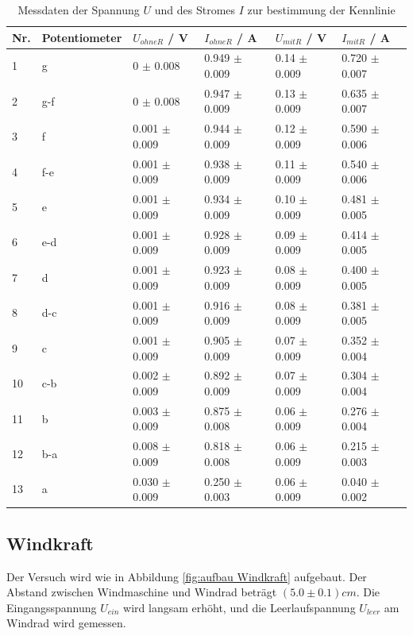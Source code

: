 \documentclass[12pt,a4paper,twoside]{article}
\begin{document}
\begin{table}[H]
    \centering
    \caption{Messdaten der Spannung $U$ und des Stromes $I$ zur bestimmung der Kennlinie}
    \label{tab:Messdaten Kennlinie Brennstoffzelle}
    \begin{tabular}{| l | l | l | l | l | l |}
        \hline
        Nr. & Potentiometer & $U_{ohneR}$  / V & $I_{ohneR}$ / A & $U_{mitR}$ / V & $I_{mitR}$ / A \\
        \hline
        1  & g    & 0     $\pm$ 0.008 & 0.949 $\pm$ 0.009 & 0.14 $\pm$ 0.009 & 0.720 $\pm$ 0.007 \\
        2  & g-f  & 0     $\pm$ 0.008 & 0.947 $\pm$ 0.009 & 0.13 $\pm$ 0.009 & 0.635 $\pm$ 0.007 \\
        3  & f    & 0.001 $\pm$ 0.009 & 0.944 $\pm$ 0.009 & 0.12 $\pm$ 0.009 & 0.590 $\pm$ 0.006 \\
        4  & f-e  & 0.001 $\pm$ 0.009 & 0.938 $\pm$ 0.009 & 0.11 $\pm$ 0.009 & 0.540 $\pm$ 0.006 \\
        5  & e    & 0.001 $\pm$ 0.009 & 0.934 $\pm$ 0.009 & 0.10 $\pm$ 0.009 & 0.481 $\pm$ 0.005 \\
        6  & e-d  & 0.001 $\pm$ 0.009 & 0.928 $\pm$ 0.009 & 0.09 $\pm$ 0.009 & 0.414 $\pm$ 0.005 \\
        7  & d    & 0.001 $\pm$ 0.009 & 0.923 $\pm$ 0.009 & 0.08 $\pm$ 0.009 & 0.400 $\pm$ 0.005 \\
        8  & d-c  & 0.001 $\pm$ 0.009 & 0.916 $\pm$ 0.009 & 0.08 $\pm$ 0.009 & 0.381 $\pm$ 0.005 \\
        9  & c    & 0.001 $\pm$ 0.009 & 0.905 $\pm$ 0.009 & 0.07 $\pm$ 0.009 & 0.352 $\pm$ 0.004 \\
        10 & c-b  & 0.002 $\pm$ 0.009 & 0.892 $\pm$ 0.009 & 0.07 $\pm$ 0.009 & 0.304 $\pm$ 0.004 \\
        11 & b    & 0.003 $\pm$ 0.009 & 0.875 $\pm$ 0.008 & 0.06 $\pm$ 0.009 & 0.276 $\pm$ 0.004 \\
        12 & b-a  & 0.008 $\pm$ 0.009 & 0.818 $\pm$ 0.008 & 0.06 $\pm$ 0.009 & 0.215 $\pm$ 0.003 \\
        13 & a    & 0.030 $\pm$ 0.009 & 0.250 $\pm$ 0.003 & 0.06 $\pm$ 0.009 & 0.040 $\pm$ 0.002 \\
        \hline  
    \end{tabular}
\end{table}

\subsection{Windkraft}
Der Versuch wird wie in Abbildung \ref{fig:aufbau Windkraft} aufgebaut. Der Abstand zwischen Windmaschine und Windrad beträgt $(5.0 \pm 0.1)cm$. 
Die Eingangsspannung $U_{ein}$ wird langsam erhöht, und die Leerlaufspannung $U_{leer}$ am Windrad wird gemessen. 
\end{document}
